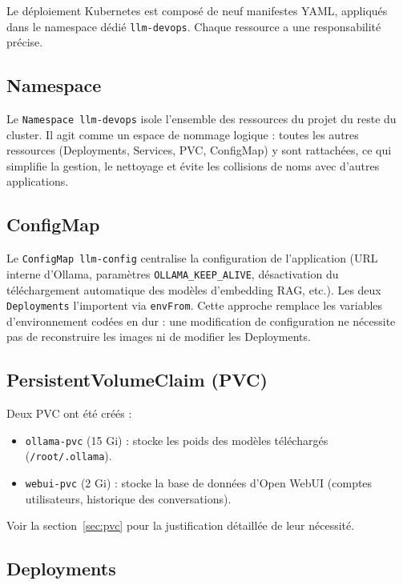 ﻿\documentclass[11pt,a4paper]{article}
\begin{document}
Le déploiement Kubernetes est composé de neuf manifestes YAML, appliqués dans le namespace dédié \texttt{llm-devops}. Chaque ressource a une responsabilité précise.

\subsection{Namespace}

Le \texttt{Namespace llm-devops} isole l'ensemble des ressources du projet du reste du cluster. Il agit comme un espace de nommage logique : toutes les autres ressources (Deployments, Services, PVC, ConfigMap) y sont rattachées, ce qui simplifie la gestion, le nettoyage et évite les collisions de noms avec d'autres applications.

\subsection{ConfigMap}

Le \texttt{ConfigMap llm-config} centralise la configuration de l'application (URL interne d'Ollama, paramètres \texttt{OLLAMA\_KEEP\_ALIVE}, désactivation du téléchargement automatique des modèles d'embedding RAG, etc.). Les deux \texttt{Deployments} l'importent via \texttt{envFrom}. Cette approche remplace les variables d'environnement codées en dur : une modification de configuration ne nécessite pas de reconstruire les images ni de modifier les Deployments.

\subsection{PersistentVolumeClaim (PVC)}

Deux PVC ont été créés :
\begin{itemize}[nosep]
    \item \texttt{ollama-pvc} (15 Gi) : stocke les poids des modèles téléchargés (\texttt{/root/.ollama}).
    \item \texttt{webui-pvc} (2 Gi) : stocke la base de données d'Open WebUI (comptes utilisateurs, historique des conversations).
\end{itemize}

Voir la section~\ref{sec:pvc} pour la justification détaillée de leur nécessité.

\subsection{Deployments}
\end{document}
